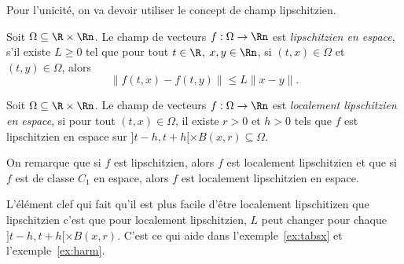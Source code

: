 Pour l'unicité, on va devoir utiliser le concept de champ lipschitzien.
\begin{mydef}
  Soit $\Omega \subseteq \R \times \Rn$.
  Le champ de vecteurs $f:\Omega\to\Rn$ est \emph{lipschitzien
  en espace}, s'il existe $L \geq 0$ tel que pour tout
  $t\in\R$, $x,y\in\Rn$, si $(t,x) \in \Omega$ et $(t,y) \in \Omega$, alors
  \[ \|f(t,x) - f(t,y)\| \leq L \|x - y\|. \]
\end{mydef}
\begin{mydef}
  Soit $\Omega \subseteq \R \times \Rn$.
  Le champ de vecteurs $f:\Omega\to\Rn$ est \emph{localement lipschitzien
  en espace}, si pour tout
  $(t,x) \in \Omega$,
  il existe $r > 0$ et $h > 0$ tels que
  $f$ est lipschitzien en espace sur
  $]t-h,t+h[ \times B(x,r) \subseteq \Omega$.
\end{mydef}
On remarque que si $f$ est lipschitzien, alors $f$ est localement lipschitzien
et que si $f$ est de classe $C_1$ en espace, alors $f$ est localement
lipschitzien en espace.

L'élément clef qui fait qu'il est plus facile d'être localement lipschitizen
que lipschitzien c'est que pour localement lipschitzien, $L$ peut changer
pour chaque $]t-h,t+h[ \times B(x,r)$.
C'est ce qui aide dans l'exemple~\ref{ex:tabsx} et l'exemple~\ref{ex:harm}.

